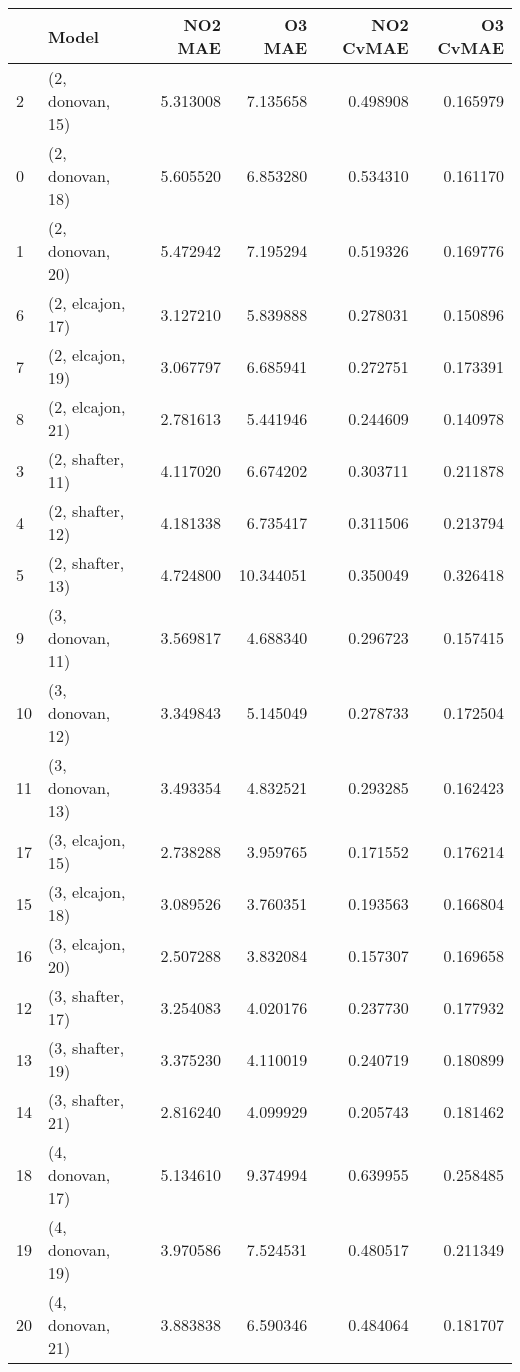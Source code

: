 \begin{tabular}{llrrrr}
\toprule
{} &             Model &    NO2 MAE &     O3 MAE &  NO2 CvMAE &  O3 CvMAE \\
\midrule
2  &  (2, donovan, 15) &   5.313008 &   7.135658 &   0.498908 &  0.165979 \\
0  &  (2, donovan, 18) &   5.605520 &   6.853280 &   0.534310 &  0.161170 \\
1  &  (2, donovan, 20) &   5.472942 &   7.195294 &   0.519326 &  0.169776 \\
6  &  (2, elcajon, 17) &   3.127210 &   5.839888 &   0.278031 &  0.150896 \\
7  &  (2, elcajon, 19) &   3.067797 &   6.685941 &   0.272751 &  0.173391 \\
8  &  (2, elcajon, 21) &   2.781613 &   5.441946 &   0.244609 &  0.140978 \\
3  &  (2, shafter, 11) &   4.117020 &   6.674202 &   0.303711 &  0.211878 \\
4  &  (2, shafter, 12) &   4.181338 &   6.735417 &   0.311506 &  0.213794 \\
5  &  (2, shafter, 13) &   4.724800 &  10.344051 &   0.350049 &  0.326418 \\
9  &  (3, donovan, 11) &   3.569817 &   4.688340 &   0.296723 &  0.157415 \\
10 &  (3, donovan, 12) &   3.349843 &   5.145049 &   0.278733 &  0.172504 \\
11 &  (3, donovan, 13) &   3.493354 &   4.832521 &   0.293285 &  0.162423 \\
17 &  (3, elcajon, 15) &   2.738288 &   3.959765 &   0.171552 &  0.176214 \\
15 &  (3, elcajon, 18) &   3.089526 &   3.760351 &   0.193563 &  0.166804 \\
16 &  (3, elcajon, 20) &   2.507288 &   3.832084 &   0.157307 &  0.169658 \\
12 &  (3, shafter, 17) &   3.254083 &   4.020176 &   0.237730 &  0.177932 \\
13 &  (3, shafter, 19) &   3.375230 &   4.110019 &   0.240719 &  0.180899 \\
14 &  (3, shafter, 21) &   2.816240 &   4.099929 &   0.205743 &  0.181462 \\
18 &  (4, donovan, 17) &   5.134610 &   9.374994 &   0.639955 &  0.258485 \\
19 &  (4, donovan, 19) &   3.970586 &   7.524531 &   0.480517 &  0.211349 \\
20 &  (4, donovan, 21) &   3.883838 &   6.590346 &   0.484064 &  0.181707 \\

\end{tabular}
